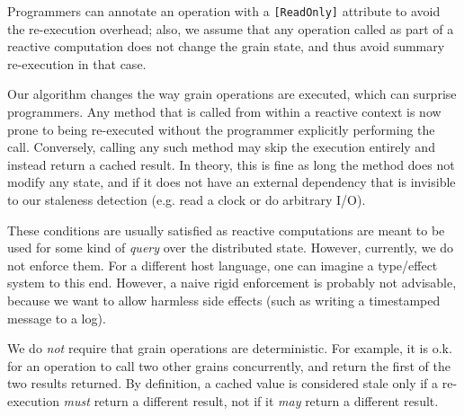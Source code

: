 Programmers can annotate an operation with a \lstinline|[ReadOnly]| attribute to avoid the re-execution overhead; also, we assume that any operation called as part of a reactive computation does not change the grain state, and thus avoid summary re-execution in that case.

Our algorithm changes the way grain operations are executed, which can surprise programmers.  Any method that is called from within a reactive context is now prone to being re-executed without the programmer explicitly performing the call. Conversely, calling any such method may skip the execution entirely and instead return a cached result. In theory, this is fine as long the method does not modify any state, and if it does not have an external dependency that is invisible to our staleness detection (e.g. read a clock or do arbitrary I/O). 

These conditions are usually satisfied as reactive computations are meant to be used for some kind of \emph{query} over the distributed state. However, currently, we do not enforce them. For a different host language, one can imagine a type/effect system to this end. However, a naive rigid enforcement is probably not advisable, because we want to allow harmless side effects (such as writing a timestamped message to a log). 

We do \emph{not} require that grain operations are deterministic. For example, it is o.k. for an operation to call two other grains concurrently, and return the first of the two results returned. By definition, a cached value is considered stale only if a re-execution \emph{must} return a different result, not if it \emph{may} return a different result.
 
